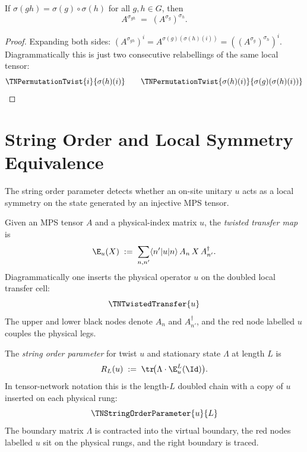 \begin{lemma}\label{lem:perm_twisted_mul}
    \leanok
    If $\sigma(gh) = \sigma(g) \circ \sigma(h)$ for all $g, h \in G$,
    then
    \[
        A^{\sigma_{gh}} \;=\; (A^{\sigma_g})^{\sigma_h}.
    \]
\end{lemma}

\begin{proof}\leanok{}
    Expanding both sides:
    $(A^{\sigma_{gh}})^i = A^{\sigma(g)(\sigma(h)(i))} = ((A^{\sigma_g})^{\sigma_h})^i$.
    Diagrammatically this is just two consecutive relabellings of the same
    local tensor:
    \[
        \TNPermutationTwist{i}{\sigma(h)(i)}
        \qquad
        \TNPermutationTwist{\sigma(h)(i)}{\sigma(g)(\sigma(h)(i))}
    \]
\end{proof}

\section{String Order and Local Symmetry Equivalence}

The string order parameter \cite{PerezGarcia2008StringOrder} detects
whether an on-site unitary $u$ acts as a local symmetry on the state
generated by an injective MPS tensor.

\begin{definition}\label{def:twisted_transfer_map}
    \leanok
    Given an MPS tensor $A$ and a physical-index matrix $u$, the
    \emph{twisted transfer map} is
    \[
        \E_u(X) \;:=\; \sum_{n,n'} \langle n'|u|n\rangle\,
        A_n\, X\, A_{n'}^\dagger.
    \]
    Diagrammatically one inserts the physical operator $u$ on the doubled
    local transfer cell:
    \[
        \TNTwistedTransfer{u}
    \]
    The upper and lower black nodes denote $A_n$ and $A_{n'}^\dagger$, and the
    red node labelled $u$ couples the physical legs.
\end{definition}

\begin{definition}\label{def:string_order_param}
    \leanok
    The \emph{string order parameter} for twist $u$ and stationary
    state $\Lambda$ at length $L$ is
    \[
        R_L(u) \;:=\; \tr\!\bigl(\Lambda \cdot \E_u^L(\Id)\bigr).
    \]
    In tensor-network notation this is the length-$L$ doubled chain with a
    copy of $u$ inserted on each physical rung:
    \[
        \TNStringOrderParameter{u}{L}
    \]
    The boundary matrix $\Lambda$ is contracted into the virtual boundary, the
    red nodes labelled $u$ sit on the physical rungs, and the right boundary
    is traced.
\end{definition}

